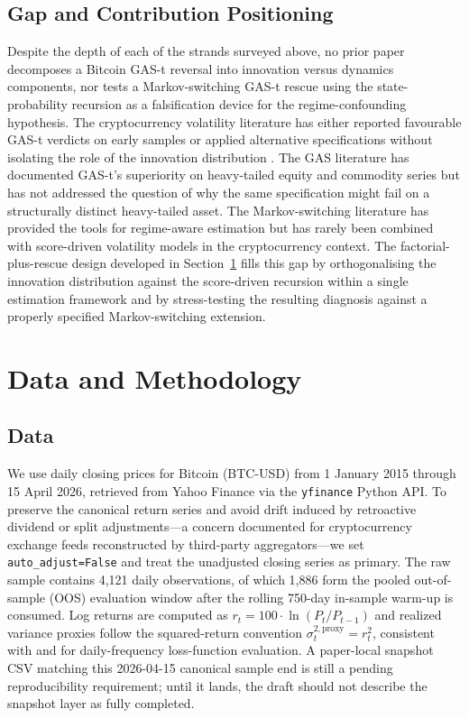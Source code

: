 \subsection{Gap and Contribution Positioning}

Despite the depth of each of the strands surveyed above, no prior paper decomposes a Bitcoin GAS-t reversal into innovation versus dynamics components, nor tests a Markov-switching GAS-t rescue using the \citet{klaassen2002} state-probability recursion as a falsification device for the regime-confounding hypothesis. The cryptocurrency volatility literature has either reported favourable GAS-t verdicts on early samples \citep{catania2017} or applied alternative specifications without isolating the role of the innovation distribution \citep{klein2018,liu2021}. The GAS literature has documented GAS-t's superiority on heavy-tailed equity and commodity series \citep{lucas2016,catania2019} but has not addressed the question of why the same specification might fail on a structurally distinct heavy-tailed asset. The Markov-switching literature has provided the tools for regime-aware estimation but has rarely been combined with score-driven volatility models in the cryptocurrency context. The factorial-plus-rescue design developed in Section~\ref{sec:data} fills this gap by orthogonalising the innovation distribution against the score-driven recursion within a single estimation framework and by stress-testing the resulting diagnosis against a properly specified Markov-switching extension.

\section{Data and Methodology}
\label{sec:data}

\subsection{Data}

We use daily closing prices for Bitcoin (BTC-USD) from 1 January 2015 through 15 April 2026, retrieved from Yahoo Finance via the \texttt{yfinance} Python API. To preserve the canonical return series and avoid drift induced by retroactive dividend or split adjustments---a concern documented for cryptocurrency exchange feeds reconstructed by third-party aggregators---we set \texttt{auto\_adjust=False} and treat the unadjusted closing series as primary. The raw sample contains 4,121 daily observations, of which 1,886 form the pooled out-of-sample (OOS) evaluation window after the rolling 750-day in-sample warm-up is consumed. Log returns are computed as $r_t = 100 \cdot \ln(P_t / P_{t-1})$ and realized variance proxies follow the squared-return convention $\sigma^{2,\text{proxy}}_t = r_t^2$, consistent with \citet{patton2011} and \citet{hansen2003} for daily-frequency loss-function evaluation. A paper-local snapshot CSV matching this 2026-04-15 canonical sample end is still a pending reproducibility requirement; until it lands, the draft should not describe the snapshot layer as fully completed.

